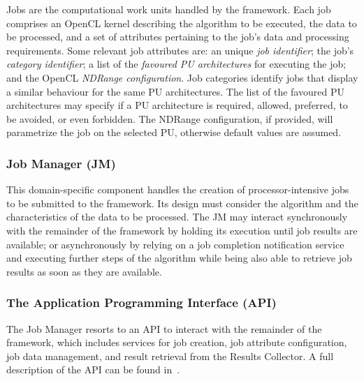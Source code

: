 \documentclass[runningheads,a4paper]{llncs}
\begin{document}
Jobs are the computational work units handled by the framework. Each job comprises an OpenCL kernel describing the algorithm to be executed, the data to be processed, and a set of attributes pertaining to the job's data and processing requirements.
Some relevant job attributes are: an unique \emph{job identifier}; the job's \emph{category identifier}; a list of the \emph{favoured PU architectures} for executing the job; and the OpenCL \emph{NDRange configuration}. Job categories identify jobs that display a similar behaviour for the same PU architectures.
The list of the favoured PU architectures may specify if a PU architecture is required, allowed, preferred, to be avoided, or even forbidden. The NDRange configuration, if provided, will parametrize the job on the selected PU, otherwise default values are assumed.


\subsubsection{Job Manager (JM)}
\label{subsub:job_manager}

This domain-specific component handles the creation of processor-intensive jobs to be submitted to the framework. Its design must consider the algorithm and the characteristics of the data to be processed.
The JM may interact synchronously with the remainder of the framework by holding its execution until job results are available; or asynchronously by relying on a job completion notification service and executing further steps of the algorithm while being also able to retrieve job results as soon as they are available.
%

\subsubsection{The Application Programming Interface (API)}
\label{subsub:API}

The Job Manager resorts to an API to interact with the remainder of the framework, which includes services for job creation, job attribute configuration, job data management, and result retrieval from the Results Collector. A full description of the API can be found in~\cite{LuisOliveira:MSc:2011}.
\end{document}
